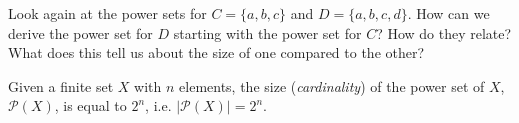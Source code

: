 \begin{exposition}
    Look again at the power sets for \(C=\{a,b,c\}\) and \(D=\{a,b,c,d\}\).  How can we derive the power set for \(D\) starting with the power set for \(C\)?  How do they relate?  What does this tell us about the size of one compared to the other?
    \vspace{0.8\textheight}
\end{exposition}
\begin{thm}
    Given a finite set \(X\) with \(n\) elements, the size (\emph{cardinality}) of the power set of \(X\), \(\mathscr{P}(X)\), is equal to \(2^n\), i.e. \(\left|\mathscr{P}(X)\right|=2^n\).
\end{thm}



